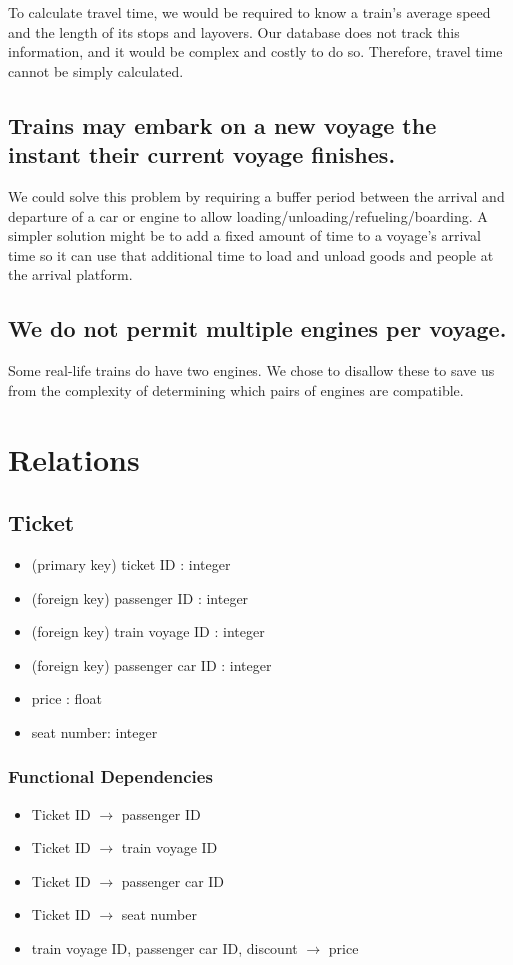 \documentclass[a4paper]{article}
\begin{document}
To calculate travel time, we would be required to know a train’s average speed and the length of its stops and layovers. Our database does not track this information, and it would be complex and costly to do so. Therefore, travel time cannot be simply calculated.	

\subsection*{Trains may embark on a new voyage the instant their current voyage finishes.}
We could solve this problem by requiring a buffer period between the arrival and departure of a car or engine to allow loading/unloading/refueling/boarding. A simpler solution might be to add a fixed amount of time to a voyage’s arrival time so it can use that additional time to load and unload goods and people at the arrival platform.

\subsection*{We do not permit multiple engines per voyage.}
Some real-life trains do have two engines. We chose to disallow these to save us from the complexity of determining which pairs of engines are compatible.


\section{Relations}
\subsection*{Ticket}
\begin{itemize}
\item (primary key) ticket ID : integer
\item (foreign key) passenger ID : integer
\item (foreign key) train voyage ID : integer
\item (foreign key) passenger car ID : integer
\item price : float
\item seat number: integer
\end{itemize}

\subsubsection*{Functional Dependencies}
\begin{itemize}
\item Ticket ID $\rightarrow$ passenger ID
\item Ticket ID $\rightarrow$ train voyage ID
\item Ticket ID $\rightarrow$ passenger car ID
\item Ticket ID $\rightarrow$ seat number
\item train voyage ID, passenger car ID, discount $\rightarrow$ price
\end{itemize}
\end{document}
